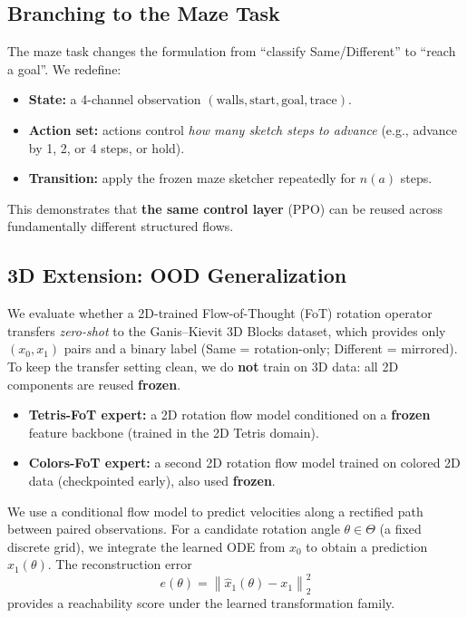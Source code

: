 \documentclass{l4proj}
\begin{document}
\subsection{Branching to the Maze Task}
The maze task changes the formulation from ``classify Same/Different'' to ``reach a goal''. We redefine:
\begin{itemize}
    \item \textbf{State:} a 4-channel observation $(\text{walls}, \text{start}, \text{goal}, \text{trace})$.
    \item \textbf{Action set:} actions control \emph{how many sketch steps to advance} (e.g., advance by 1, 2, or 4 steps, or hold).
    \item \textbf{Transition:} apply the frozen maze sketcher repeatedly for $n(a)$ steps.
\end{itemize}
This demonstrates that \textbf{the same control layer} (PPO) can be reused across fundamentally different structured flows.

\subsection{3D Extension: OOD Generalization}
We evaluate whether a 2D-trained Flow-of-Thought (FoT) rotation operator transfers \emph{zero-shot} to the Ganis--Kievit 3D Blocks dataset, which provides only $(x_0,x_1)$ pairs and a binary label (Same = rotation-only; Different = mirrored). To keep the transfer setting clean, we do \textbf{not} train on 3D data: all 2D components are reused \textbf{frozen}.

\begin{itemize}
    \item \textbf{Tetris-FoT expert:} a 2D rotation flow model conditioned on a \textbf{frozen} feature backbone (trained in the 2D Tetris domain).
    \item \textbf{Colors-FoT expert:} a second 2D rotation flow model trained on colored 2D data (checkpointed early), also used \textbf{frozen}.
\end{itemize}

We use a conditional flow model to predict velocities along a rectified path between paired observations. For a candidate rotation angle $\theta \in \Theta$ (a fixed discrete grid), we integrate the learned ODE from $x_0$ to obtain a prediction $\hat{x}_1(\theta)$. The reconstruction error
\[
e(\theta) = \left\lVert \hat{x}_1(\theta) - x_1 \right\rVert_2^2
\]
provides a reachability score under the learned transformation family.
\end{document}
